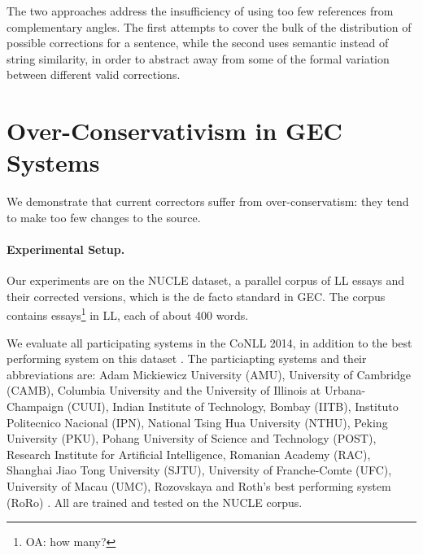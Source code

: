 \documentclass[letter,11pt]{article}
\newcommand{\oa}[1]{\footnote{\color{red}OA: #1}}
\begin{document}
The two approaches address the insufficiency of using too few references from
complementary angles. 
The first attempts to cover the bulk of the distribution of possible
corrections for a sentence, while the second
uses semantic instead of string similarity, in order to abstract away
from some of the formal variation between different valid corrections.

\section{Over-Conservativism in GEC Systems}\label{sec:formal_conservatism}



We demonstrate that current correctors
suffer from over-conservatism: they tend to make too few changes to the source. 


\paragraph{Experimental Setup.}\label{par:experimental_setup}

Our experiments are on the NUCLE dataset,
a parallel corpus of LL essays and their corrected versions,
which is the de facto standard in GEC.
The corpus contains essays\oa{how many?} in LL, each of about 400 words.

We evaluate all participating systems in the CoNLL 2014,
in addition to the best performing system on this dataset \cite{rozovskaya2014building}.
The particiapting systems and their abbreviations are: Adam Mickiewicz University (AMU),
University of Cambridge (CAMB), Columbia University and the University of Illinois at Urbana-Champaign (CUUI),
Indian Institute of Technology, Bombay (IITB), Instituto Politecnico Nacional (IPN),
National Tsing Hua University (NTHU), Peking University (PKU), Pohang University of Science and Technology (POST),
Research Institute for Artificial Intelligence, Romanian Academy (RAC), Shanghai Jiao Tong University (SJTU),
University of Franche-Comte (UFC), University of Macau (UMC),
Rozovskaya and Roth's best performing system (RoRo) \cite{rozovskaya2016grammatical}.
All are trained and tested on the NUCLE corpus.
\end{document}
